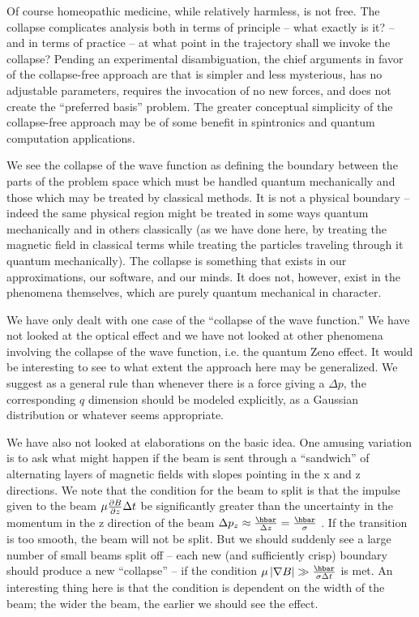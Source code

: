\documentclass[aps,prl,superscriptaddress,12pt]{revtex4-2}
\begin{document}
Of course homeopathic medicine, while relatively harmless, is not free. 
The collapse complicates analysis both in terms of principle -- what exactly is it? -- and in terms of practice -- at what point in the trajectory shall we invoke the collapse? 
Pending an experimental disambiguation, 
the chief arguments in favor of the collapse-free approach are that is simpler and less mysterious, 
has no adjustable parameters, 
requires the invocation of no new forces, and does not create the ``preferred basis'' problem. 
The greater conceptual simplicity of the collapse-free approach may be 
of some benefit in spintronics and quantum computation applications.

We see the collapse of the wave function as defining the boundary between the parts of the problem space which must be handled quantum mechanically and those which may be treated by classical methods. 
It is not a physical boundary -- indeed the same physical region might be treated in some ways quantum mechanically and in others classically (as we have done here, by treating the magnetic field in classical terms while treating the particles traveling through it quantum mechanically). 
The collapse is something that exists in our approximations, our software, and our minds. 
It does not, however, exist in the phenomena themselves, which are purely quantum mechanical in character.

We have only dealt with one case of the ``collapse of the wave function.''
We have not looked at the optical \sg effect\cite{Cook:1978,Cook:1987,Vaglica:1996,Chough:2001,Baym:1969} 
and we have not looked at other phenomena involving the collapse of the wave function, 
i.e. the quantum Zeno effect. 
It would be interesting to see to what extent the approach here may be generalized. 
We suggest as a general rule than whenever there is a force giving a $\Delta p$, 
the corresponding $q$ dimension should be modeled explicitly, 
as a Gaussian distribution or whatever seems appropriate.

We have also not looked at elaborations on the basic \sg idea. 
One amusing variation is to ask what might happen if the beam is sent through a ``sandwich''
of alternating layers of magnetic fields with slopes pointing in the x and z directions.
We note that the condition for the beam to split is that the impulse given to the beam 
$\mu {{\partial B} \over {\partial z }}\Delta t$
be significantly greater than the uncertainty in the momentum in the z direction of the beam
$\Delta p_z\approx {\hbar  \over {\Delta z}}={\hbar  \over \sigma }$
\cite{Baym:1969}. 
If the transition is too smooth, the beam will not be split.
But we should suddenly see a large number of small beams split off
-- each new (and sufficiently crisp) boundary should produce a new ``collapse'' 
-- if the condition  
$\mu \left| {\nabla B} \right|\gg{\hbar  \over {\sigma \Delta t}}$
is met. 
An interesting thing here is that the condition is dependent on the width of the beam; 
the wider the beam, the earlier we should see the effect.
\end{document}
